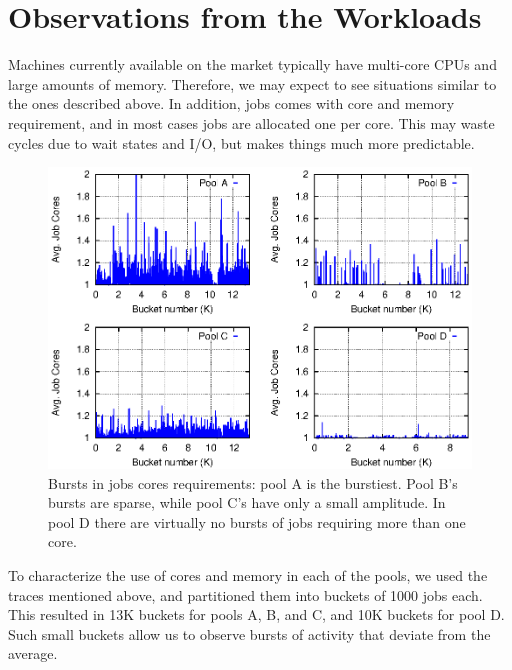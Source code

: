 \section{Observations from the Workloads}

Machines currently available on the market typically have multi-core
CPUs and large amounts of memory.
Therefore, we may expect to see situations similar to the ones
described above.
In addition, jobs comes with core and memory requirement, and in most
cases jobs are allocated one per core.
This may waste cycles due to wait states and I/O, but makes things
much more predictable.

\begin{figure}\centering
	\includegraphics{figures/cores_burst.eps}
\caption{Bursts in jobs cores requirements: pool A is the burstiest.
  Pool B's bursts are sparse, while pool C's have only a small
  amplitude.
  In pool D there are virtually no bursts of jobs requiring more than
  one core.}
\label{fig:cores_burst_multiplot}
\end{figure}

To characterize the use of cores and memory in each of the pools, 
we used the traces mentioned above, 
and partitioned them into buckets of 1000 jobs each. 
This resulted in 13K buckets for pools A, B, and C, 
and 10K buckets for pool D.
Such small buckets allow us to observe bursts of activity that deviate
from the average.


